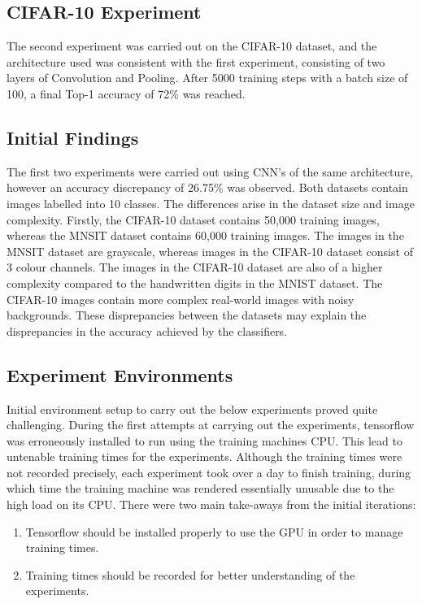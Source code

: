 \documentclass[12pt]{report}
\begin{document}
\newpage
\subsection{CIFAR-10 Experiment}

\begin{flushleft}
The second experiment was carried out on the CIFAR-10 dataset, and the architecture used was consistent with the first experiment, consisting of two layers of Convolution and Pooling. After 5000 training steps with a batch size of 100, a final Top-1 accuracy of 72\% was reached.
\end{flushleft}

\subsection{Initial Findings}

The first two experiments were carried out using CNN's of the same architecture, however an accuracy discrepancy of 26.75\% was observed. Both datasets contain images labelled into 10 classes. The differences arise in the dataset size and image complexity. Firstly, the CIFAR-10 dataset contains 50,000 training images, whereas the MNSIT dataset contains 60,000 training images. The images in the MNSIT dataset are grayscale, whereas images in the CIFAR-10 dataset consist of 3 colour channels. The images in the CIFAR-10 dataset are also of a higher complexity compared to the handwritten digits in the MNIST dataset. The CIFAR-10 images contain more complex real-world images with noisy backgrounds. These disprepancies between the datasets may explain the disprepancies in the accuracy achieved by the classifiers.

\subsection{Experiment Environments}
\begin{flushleft}
Initial environment setup to carry out the below experiments proved quite challenging. During the first attempts at carrying out the experiments, tensorflow was erroneously installed to run using the training machines CPU. This lead to untenable training times for the experiments. Although the training times were not recorded precisely, each experiment took over a day to finish training, during which time the training machine was rendered essentially unusable due to the high load on its CPU. There were two main take-aways from the initial iterations:

\begin{enumerate}
  \item Tensorflow should be installed properly to use the GPU in order to manage training times.
  \item Training times should be recorded for better understanding of the experiments.
\end{enumerate}

\end{flushleft}
\end{document}
